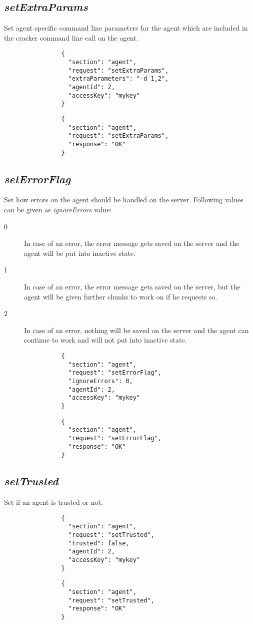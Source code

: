 \documentclass{article}
\begin{document}
		\subsection*{\textit{setExtraParams}}
			Set agent specific command line parameters for the agent which are included in the cracker command line call on the agent.
			{
				\color{blue}
				\begin{verbatim}
				{
				  "section": "agent",
				  "request": "setExtraParams",
				  "extraParameters": "-d 1,2",
				  "agentId": 2,
				  "accessKey": "mykey"
				}
				\end{verbatim}
			}
			{
				\color{OliveGreen}
				\begin{verbatim}
				{
				  "section": "agent",
				  "request": "setExtraParams",
				  "response": "OK"
				}
				\end{verbatim}
			}
		\subsection*{\textit{setErrorFlag}}
			Set how errors on the agent should be handled on the server. Following values can be given as \textit{ignoreErrors} value:
			\begin{description}
				\item[0] In case of an error, the error message gets saved on the server and the agent will be put into inactive state.
				\item[1] In case of an error, the error message gets saved on the server, but the agent will be given further chunks to work on if he requests so.
				\item[2] In case of an error, nothing will be saved on the server and the agent can continue to work and will not put into inactive state.
			\end{description}
			{
				\color{blue}
				\begin{verbatim}
				{
				  "section": "agent",
				  "request": "setErrorFlag",
				  "ignoreErrors": 0,
				  "agentId": 2,
				  "accessKey": "mykey"
				}
				\end{verbatim}
			}
			{
				\color{OliveGreen}
				\begin{verbatim}
				{
				  "section": "agent",
				  "request": "setErrorFlag",
				  "response": "OK"
				}
				\end{verbatim}
			}
		\subsection*{\textit{setTrusted}}
			Set if an agent is trusted or not.
			{
				\color{blue}
				\begin{verbatim}
				{
				  "section": "agent",
				  "request": "setTrusted",
				  "trusted": false,
				  "agentId": 2,
				  "accessKey": "mykey"
				}
				\end{verbatim}
			}
			{
				\color{OliveGreen}
				\begin{verbatim}
				{
				  "section": "agent",
				  "request": "setTrusted",
				  "response": "OK"
				}
				\end{verbatim}
			}
		
\end{document}
